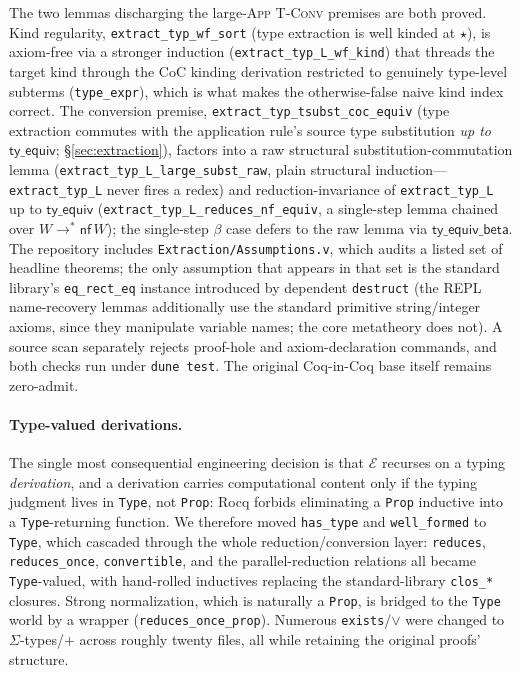 \documentclass[acmsmall,anonymous=false,nonacm]{acmart}
\newcommand{\kstar}{\ensuremath{\star}}
\newcommand{\ext}{\mathcal{E}}
\newcommand{\nf}{\mathsf{nf}}
\begin{document}
The two lemmas discharging the large-\textsc{App} \textsc{T-Conv} premises are
both proved. Kind regularity, \texttt{extract\_typ\_wf\_sort} (type extraction is
well kinded at $\kstar$), is axiom-free via a stronger induction
(\texttt{extract\_typ\_L\_wf\_kind}) that threads the target kind through the CoC
kinding derivation restricted to genuinely type-level subterms
(\texttt{type\_expr}), which is what makes the otherwise-false naive kind index
correct. The conversion premise, \texttt{extract\_typ\_tsubst\_coc\_equiv}
(type extraction commutes with the application rule's source type substitution
\emph{up to} $\mathsf{ty\_equiv}$; \S\ref{sec:extraction}), factors into a raw
structural substitution-commutation lemma
(\texttt{extract\_typ\_L\_large\_subst\_raw}, plain structural induction---%
\texttt{extract\_typ\_L} never fires a redex) and reduction-invariance of
\texttt{extract\_typ\_L} up to $\mathsf{ty\_equiv}$
(\texttt{extract\_typ\_L\_reduces\_nf\_equiv}, a single-step lemma chained over
$W \to^{*} \nf\,W$); the single-step $\beta$ case defers to the raw lemma via
$\mathsf{ty\_equiv\_beta}$. The repository includes
\texttt{Extraction/Assumptions.v}, which audits a listed set of headline
theorems; the only assumption that appears in that set is the standard library's
\texttt{eq\_rect\_eq} instance introduced by dependent \texttt{destruct} (the
REPL name-recovery lemmas additionally use the standard primitive
string/integer axioms, since they manipulate variable names; the core metatheory
does not). A source scan separately rejects proof-hole and axiom-declaration
commands, and both checks run under \texttt{dune test}. The original
Coq-in-Coq base itself remains zero-admit.

\paragraph{Type-valued derivations.}
The single most consequential engineering decision is that $\ext$ recurses on a
typing \emph{derivation}, and a derivation carries computational content only if
the typing judgment lives in \texttt{Type}, not \texttt{Prop}: Rocq forbids
eliminating a \texttt{Prop} inductive into a \texttt{Type}-returning function.
We therefore moved \texttt{has\_type} and \texttt{well\_formed} to \texttt{Type},
which cascaded through the whole reduction/conversion layer: \texttt{reduces},
\texttt{reduces\_once}, \texttt{convertible}, and the parallel-reduction
relations all became \texttt{Type}-valued, with hand-rolled inductives replacing
the standard-library \texttt{clos\_*} closures. Strong normalization, which is
naturally a \texttt{Prop}, is bridged to the \texttt{Type} world by a wrapper
(\texttt{reduces\_once\_prop}). Numerous \texttt{exists}/$\vee$ were changed to
$\Sigma$-types/$+$ across roughly twenty files, all while retaining the original
proofs' structure.
\end{document}
